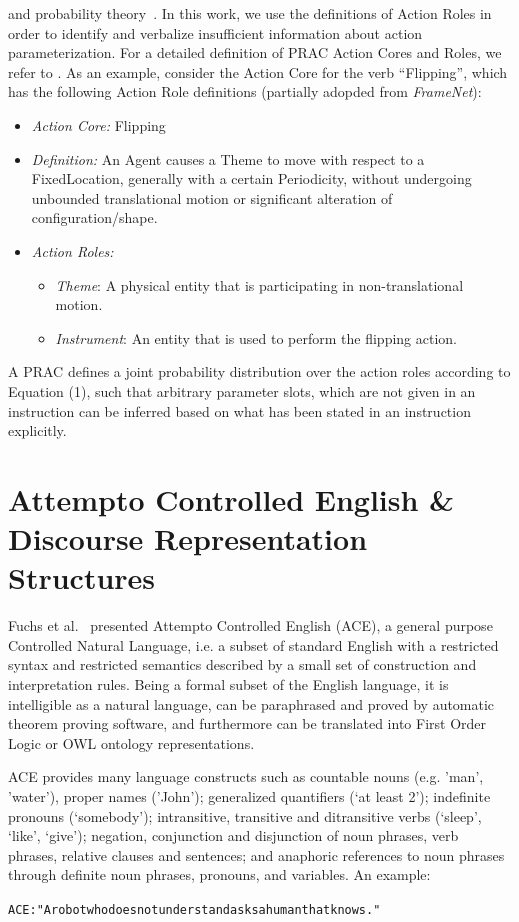 \documentclass[oribibl]{llncs}
\begin{document}
and probability theory~\cite{DBLP:journals/ml/RichardsonD06}. In this
work, we use the definitions of Action Roles in order to identify and
verbalize insufficient information about action parameterization. For a 
detailed definition of PRAC Action Cores and Roles, we refer to \cite{nyga12actioncore}.
As an example, consider the Action Core for the verb ``Flipping'', which
has the following Action Role definitions (partially adopded from \emph{FrameNet}):
\begin{itemize}
    \item \textit{Action Core:} Flipping
    \item \textit{Definition:} An Agent causes a Theme to move with respect to a FixedLocation, 
generally with a certain Periodicity, without undergoing unbounded translational 
motion or significant alteration of configuration/shape.
    \item \textit{Action Roles:}
    \begin{itemize}
        \item \textit{Theme}: A physical entity that is participating in non-translational motion.
        \item \textit{Instrument}: An entity that is used to perform the flipping action.
    \end{itemize}
\end{itemize}
A PRAC defines a joint probability distribution over the action roles
according to Equation (1), such that arbitrary parameter slots, which
are not given in an instruction can be inferred based on what has been
stated in an instruction explicitly.  

\section{Attempto Controlled English \& Discourse Representation Structures}

Fuchs et al.~\cite{fuchs:flairs2006} presented Attempto 
Controlled English (ACE), a general purpose Controlled Natural 
Language, i.e. a subset of standard English with a restricted syntax 
and restricted semantics described by a small set of construction 
and interpretation rules. Being a formal subset of the English 
language, it is intelligible as a natural language, can be 
paraphrased and proved by automatic theorem proving software, and 
furthermore can be translated into First Order Logic or OWL ontology 
representations.

ACE provides many language constructs such as countable nouns (e.g. 
'man', 'water'), proper names ('John'); generalized quantifiers (‘at 
least 2’); indefinite pronouns (‘somebody’); intransitive, 
transitive and ditransitive verbs (‘sleep’, ‘like’, ‘give’); 
negation, conjunction and disjunction of noun phrases, verb phrases, 
relative clauses and sentences; and anaphoric references to noun 
phrases through definite noun phrases, pronouns, and variables. An 
example: \begin{alltt}{\color{red} ACE:} \small"A robot who does not understand asks a human that knows."\end{alltt}
\end{document}

